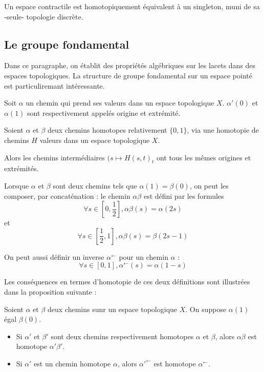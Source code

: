 \begin{prop}
Un espace contractile est homotopiquement \'equivalent \`a un singleton, muni de sa -seule- topologie discr\`ete.
\end{prop}

\subsection{Le groupe fondamental}

Dans ce paragraphe, on \'etablit des propri\'et\'es alg\'ebriques sur les lacets dans des espaces topologiques. La structure de groupe fondamental sur un espace point\'e est particuliremant int\'eressante.

\begin{defi}
Soit $\alpha$ un chemin qui prend ses valeurs dans un espace topologique $X$. $\alpha '(0)$ et $\alpha (1)$ sont respectivement appel\'es origine et extr\'emit\'e.
\end{defi}

\begin{exem}
Soient $\alpha$ et $\beta$ deux chemins homotopes relativement  $\{0,1\}$, via une homotopie de chemins $H$  valeurs dans un espace topologique $X$.

Alors les chemins interm\'ediaires $(s\mapsto H(s,t)_t$ ont tous les m\^emes origines et extr\'emit\'es.
\end{exem}

Lorsque $\alpha$ et $\beta$ sont deux chemins tels que $\alpha (1)=\beta (0)$, on peut les composer, par concat\'enation : le chemin $\alpha \beta$ est d\'efini par les formules
\[\forall s\in \left[0,\frac{1}{2}\right] , \alpha \beta (s) = \alpha (2s)\]%
et
\[\forall s \in \left[\frac{1}{2} , 1\right] , \alpha \beta (s) = \beta (2s-1)\]

On peut aussi d\'efinir un inverse $\alpha^{\leftarrow}$ pour un chemin $\alpha$ :
\[\forall s \in [0,1] , \alpha^{\leftarrow} (s) = \alpha (1-s)\]

Les cons\'equences en termes d'homotopie de ces deux d\'efinitions sont illustr\'ees dans la proposition suivante :

\begin{prop}
Soient $\alpha$ et $\beta$ deux chemins sunr un espace topologique $X$. On suppose $\alpha (1)$ \'egal  $\beta (0)$.
\begin{itemize}
\item Si $\alpha '$ et $\beta '$ sont deux chemins %
respectivement homotopes $\alpha$ et $\beta$, alors $\alpha \beta$ est homotope  $\alpha '\beta '$.
\item Si $\alpha '$ est un chemin homotope  $\alpha$, alors $\alpha '^{\leftarrow}$ est homotope  $\alpha^{\leftarrow}$.
\end{itemize}
\end{prop}

